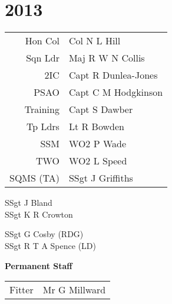 \chapter*{2013}

\vspace*{20mm}

\begin{center}
  \begin{tabular}{rl}
    Hon Col & Col N L Hill \\
    Sqn Ldr & Maj R W N Collis \\
    2IC & Capt R Dunlea-Jones \\
    PSAO & Capt C M Hodgkinson \\
    Training & Capt S Dawber \\
    Tp Ldrs & Lt R Bowden \\
    SSM & WO2 P Wade \\
    TWO & WO2 L Speed \\
    SQMS (TA) & SSgt J Griffiths \\
  \end{tabular}
\end{center}

\vspace*{5mm}

\begin{center}
  \noindent
  SSgt J Bland \\
  SSgt K R Crowton \\
\end{center}

\vspace*{10mm}

\begin{center}
  \noindent
  SSgt G Cosby (RDG) \\
  SSgt R T A Spence (LD) \\
\end{center}

\begin{center}
  \Large
  \textbf{Permanent Staff}
\end{center}

\begin{center}
  \begin{tabular}{rl}
    Fitter & Mr G Millward \\
  \end{tabular}
\end{center}
